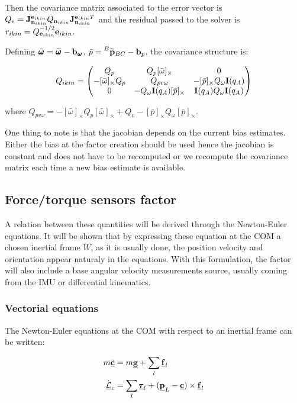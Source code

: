 \documentclass[11pt]{article}
\newcommand{\noise}{\bfn}
\newcommand{\bias}{\bfb}
\newcommand{\posiv}[1]{\underline{\bfp}_{#1}}
\newcommand{\posim}[2]{\prescript{#1}{}{\widetilde{\bfp}}_{#2}}
\newcommand{\angvel}[2]{\prescript{#1}{}{\pmb{\omega}}_{#2}}
\newcommand{\angvelm}[2]{\prescript{#1}{}{\widetilde{\pmb{\omega}}}_{#2}}
\newcommand{\forcev}[1]{\underline{\bff}_{#1}}
\newcommand{\torquev}[1]{\underline{\pmb{\tau}}_{#1}}
\newcommand{\AMv}{\underline{\mathcal{L}}}
\newcommand{\COMv}{\underline{\bfc}}
\newcommand{\gravv}{\underline{\bfg}}
\begin{document}
Then the covariance matrix associated to the error vector is $Q_e = \bfJ^{\bfe_{ikin}}_{\noise_{ikin}} Q_{\noise_{ikin}} \bfJ^{\bfe_{ikin} T}_{\noise_{ikin}}$ and the residual passed to the solver is $r_{ikin} = Q_{{\bf e}_{ikin}}^{-1/2} {\bf e}_{ikin}$.

Defining $\bar{\angvel{}{}} = \angvelm{}{} - \bias_{\angvel{}{}}$,  $\bar{p} = \posim{B}{BC} - \bias_p$, the covariance structure is:

\begin{equation}
Q_{ikin} = 
\begin{pmatrix}
Q_p  &  Q_p[\bar{\omega}]_{\times} & 0
\\
-[\bar{\omega}]_{\times}Q_p & Q_{pv\omega}& -[\bar{p}]_{\times}Q_{\omega}{\bf I}(q_A)
\\
0 & -Q_{\omega}{\bf I}(q_A)[\bar{p}]_{\times} & {\bf I}(q_A)Q_{\omega}{\bf I}(q_A)
\end{pmatrix}
\end{equation}

where $Q_{pv\omega} = -[\bar{\omega}]_{\times}Q_p[\bar{\omega}]_{\times} + Q_v - [\bar{p}]_{\times}Q_{\omega}[\bar{p}]_{\times} $.

One thing to note is that the jacobian depends on the current bias estimates. Either the bias at the factor creation should be used hence the jacobian is constant and does not have to be recomputed or we recompute the covariance matrix each time a new bias estimate is available.


\subsection{Force/torque sensors factor}
A relation between these quantities will be derived through the Newton-Euler equations. It will be shown that by expressing these equation at the COM a chosen inertial frame $W$, as it is usually done, the position velocity and orientation appear naturaly in the equations.
With this formulation, the factor will also include a base angular velocity measurements source, usually coming from the IMU or differential kinematics.

\subsubsection{Vectorial equations}
The Newton-Euler equations at the COM with respect to an inertial frame can be written:

\begin{equation}
\begin{split}
m\ddot{\COMv}&= m\gravv + \sum_l \forcev{l}
\\
\dot{\AMv}_c&= \sum_l \torquev{l} + ( \posiv{L} - \COMv) \times \forcev{l} 
\end{split}
\label{eq:NewtonEuler}
\end{equation}
\end{document}
